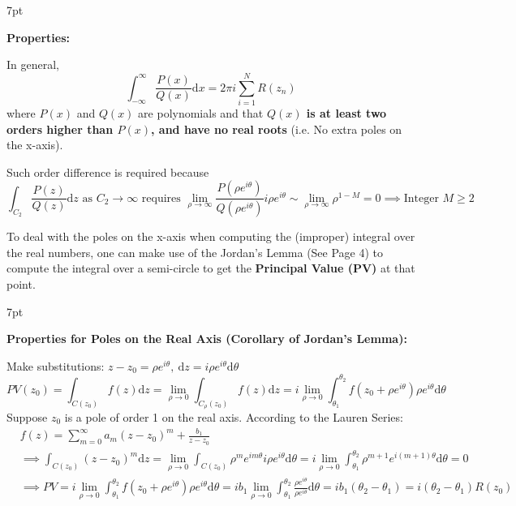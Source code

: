 \documentclass[10pt]{article}
\newcommand{\dd}{\mathrm{d}}
\newenvironment{formal}[2]{%
	\def\FrameCommand{%
		\hspace{1pt}%
		{\color{#1}\vrule width 2pt}%
		{\color{#2}\vrule width 4pt}%
		\colorbox{#2}%
	}%
	\MakeFramed{\advance\hsize-\width\FrameRestore}%
	\noindent\hspace{-4.55pt}%
	\begin{adjustwidth}{}{7pt}%
		\vspace{2pt}\vspace{2pt}%
	}
	{%
		\vspace{2pt}\end{adjustwidth}\endMakeFramed%
}
\begin{document}
\begin{formal}{Blue}{blueshade}
	\textbf{Properties:}
	
	In general,
	$$
	\int_{-\infty}^{\infty} \frac{P(x)}{Q(x)} \dd x = 2 \pi i \sum_{i=1}^N R(z_n)
	$$
	where $P(x)$ and $Q(x)$ are polynomials and that \textbf{$Q(x)$ is at least two orders higher than $P(x)$, and have no real roots} (i.e. No extra poles on the x-axis).
	
	Such order difference is required because
	$$
	\int_{C_2} \frac{P(z)}{Q(z)} \dd z \text{ as $C_2 \to \infty$ requires } \lim_{\rho\to\infty} \frac{P(\rho e^{i\theta})}{Q(\rho e^{i\theta})} i\rho e^{i\theta} \sim \lim_{\rho\to\infty} \rho^{1-M} = 0 \implies \text{Integer }M \geq 2
	$$
\end{formal}

To deal with the poles on the x-axis when computing the (improper) integral over the real numbers, one can make use of the Jordan's Lemma (See Page 4) to compute the integral over a semi-circle to get the \textbf{Principal Value (PV)} at that point.

\begin{formal}{Blue}{blueshade}
	
	\textbf{Properties for Poles on the Real Axis (Corollary of Jordan's Lemma):}
	
	\noindent Make substitutions: $z-z_0 = \rho e^{i\theta},\ \dd z = i\rho e^{i\theta} \dd \theta$
	$$
	PV(z_0) = \int_{C(z_0)} f(z) \dd z = \lim_{\rho\to 0} \int_{C_\rho(z_0)} f(z) \dd z = i \lim_{\rho\to 0} \int_{\theta_1}^{\theta_2} f(z_0+\rho e^{i\theta}) \rho e^{i\theta} \dd \theta
	$$
	Suppose $z_0$ is a pole of order 1 on the real axis. According to the Lauren Series:
	$$
	\begin{aligned}
		&f(z) = \sum_{m=0}^\infty a_m (z-z_0)^m + \frac{b_1}{z-z_0}\\
		&\implies \int_{C(z_0)} (z-z_0)^m \dd z = \lim_{\rho\to 0} \int_{C(z_0)} \rho^m e^{im\theta} i\rho e^{i\theta} \dd \theta = i \lim_{\rho\to 0} \int_{\theta_1}^{\theta_2} \rho^{m+1} e^{i(m+1)\theta} \dd \theta = 0\\
		&\implies PV = i \lim_{\rho\to 0} \int_{\theta_1}^{\theta_2} f(z_0 + \rho e^{i\theta}) \rho e^{i\theta} \dd \theta = ib_1 \lim_{\rho\to 0} \int_{\theta_1}^{\theta_2} \frac{\rho e^{i\theta}}{\rho e^{i\theta}} \dd \theta = ib_1 (\theta_2 - \theta_1) = i(\theta_2-\theta_1) R(z_0)
	\end{aligned}
	$$
	
\end{formal}
\end{document}
